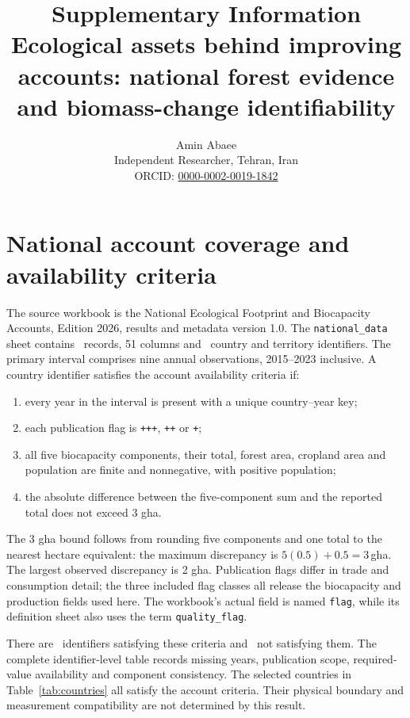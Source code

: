 \documentclass[11pt,a4paper]{article}
\title{Supplementary Information\\\large Ecological assets behind improving accounts: national forest evidence and biomass-change identifiability}
\author{Amin Abaee\\\small Independent Researcher, Tehran, Iran\\\small ORCID: \href{https://orcid.org/0000-0002-0019-1842}{0000-0002-0019-1842}}
\date{}
\begin{document}
\maketitle

\section{National account coverage and availability criteria}

The source workbook is the National Ecological Footprint and Biocapacity Accounts, Edition 2026, results and metadata version 1.0. The \texttt{national\_data} sheet contains \NationalRows\ records, 51 columns and \CountryIDs\ country and territory identifiers. The primary interval comprises nine annual observations, 2015--2023 inclusive. A country identifier satisfies the account availability criteria if:
\begin{enumerate}
\item every year in the interval is present with a unique country--year key;
\item each publication flag is \texttt{+++}, \texttt{++} or \texttt{+};
\item all five biocapacity components, their total, forest area, cropland area and population are finite and nonnegative, with positive population;
\item the absolute difference between the five-component sum and the reported total does not exceed 3 gha.
\end{enumerate}
The 3 gha bound follows from rounding five components and one total to the nearest hectare equivalent: the maximum discrepancy is $5(0.5)+0.5=3$\,gha. The largest observed discrepancy is 2 gha. Publication flags differ in trade and consumption detail; the three included flag classes all release the biocapacity and production fields used here. The workbook's actual field is named \texttt{flag}, while its definition sheet also uses the term \texttt{quality\_flag}.

There are \AccountPass\ identifiers satisfying these criteria and \AccountFail\ not satisfying them. The complete identifier-level table records missing years, publication scope, required-value availability and component consistency. The selected countries in Table~\ref{tab:countries} all satisfy the account criteria. Their physical boundary and measurement compatibility are not determined by this result.
\end{document}
